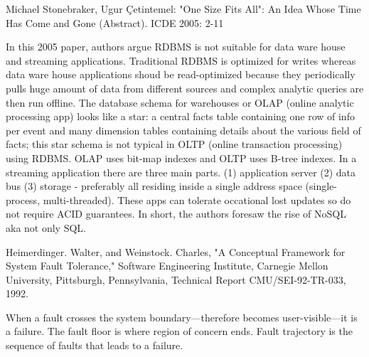 \documentclass[10pt]{scrbook}
\begin{document}
\begin{thebibliography}{9}

\bibitem{}
{\selectfont
Michael Stonebraker, Ugur Çetintemel:
"One Size Fits All": An Idea Whose Time Has Come and Gone (Abstract). ICDE 2005: 2-11
}

In this 2005 paper, authors argue RDBMS is not suitable for data ware house and streaming applications.
Traditional RDBMS is optimized for writes whereas data ware house applications shoud be read-optimized because
they periodically pulls huge amount of data from different sources and complex analytic queries are then run offline.
The database schema for warehouses or OLAP (online analytic processing app) looks like a star: a central facts table containing
one row of info per event and many dimension tables containing details about the various field of facts;
this star schema is not typical in OLTP (online transaction processing) using RDBMS. OLAP uses bit-map indexes and OLTP uses B-tree indexes.
In a streaming application there are three main parts. 
(1) application server (2) data bus (3) storage - preferably all residing inside a single address space (single-process, multi-threaded).
These apps can tolerate occational lost updates so do not require ACID guarantees. In short, the authors foresaw the rise of NoSQL aka not only SQL.

\bibitem{}
{\selectfont
Heimerdinger. Walter, and Weinstock. Charles, "A Conceptual Framework for System Fault Tolerance," Software Engineering Institute, Carnegie Mellon University, Pittsburgh, Pennsylvania, Technical Report CMU/SEI-92-TR-033, 1992.
}

When a fault crosses the system boundary---therefore becomes user-visible---it is a failure. The fault floor is where region of concern ends. Fault trajectory is the sequence of faults that leads to a failure.

%
%
\end{thebibliography}
\end{document}
